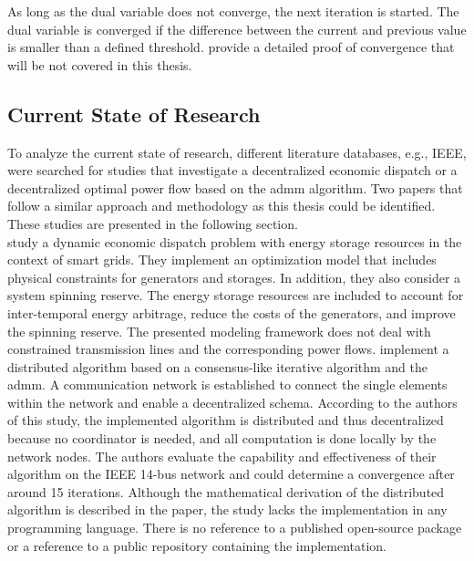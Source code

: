 As long as the dual variable does not converge, the next iteration is started. The dual variable is converged if the difference between the current and previous value is smaller than a defined threshold. \citet{boyd2010} provide a detailed proof of convergence that will be not covered in this thesis.

\subsection{Current State of Research}

To analyze the current state of research, different literature databases, e.g., IEEE, were searched for studies that investigate a decentralized economic dispatch or a decentralized optimal power flow based on the \gls{admm} algorithm. Two papers that follow a similar approach and methodology as this thesis could be identified. These studies are presented in the following section. \\

\citet{xing2017} study a dynamic economic dispatch problem with energy storage resources in the context of smart grids. They implement an optimization model that includes physical constraints for generators and storages. In addition, they also consider a system spinning reserve. The energy storage resources are included to account for inter-temporal energy arbitrage, reduce the costs of the generators, and improve the spinning reserve. The presented modeling framework does not deal with constrained transmission lines and the corresponding power flows. \citet{xing2017} implement a distributed algorithm based on a consensus-like iterative algorithm and the \gls{admm}. A communication network is established to connect the single elements within the network and enable a decentralized schema. According to the authors of this study, the implemented algorithm is distributed and thus decentralized because no coordinator is needed, and all computation is done locally by the network nodes. The authors evaluate the capability and effectiveness of their algorithm on the IEEE 14-bus network and could determine a convergence after around 15 iterations. Although the mathematical derivation of the distributed algorithm is described in the paper, the study lacks the implementation in any programming language. There is no reference to a published open-source package or a reference to a public repository containing the implementation. \\

